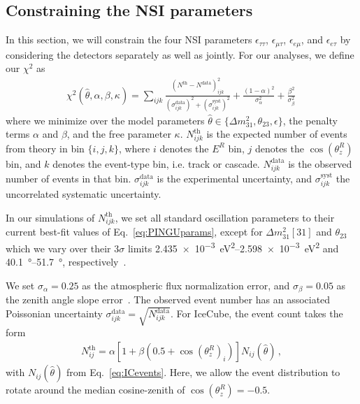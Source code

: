 \documentclass{revtex4-2}
\newcommand{\zreco}{\ensuremath{\cos{(\theta_z^{R})}}}
\newcommand{\Ereco}{E^{R}}
\newcommand{\emt}{\ensuremath{\epsilon_{\mu\tau}}}
\newcommand{\eet}{\epsilon_{e\tau}}
\newcommand{\eem}{\epsilon_{e\mu}}
\newcommand{\ett}{\ensuremath{\epsilon_{\tau\tau}}}
\newcommand{\dm}{\Delta m^2_{31}}
\begin{document}
\subsection{Constraining the NSI parameters}\label{sec:constraining} %
In this section, we will constrain the four NSI parameters $\ett$, $\emt$, $\eem$, and $\eet$ by considering the detectors separately as well as jointly.
For our analyses, we define our $\chi^2$ as
\begin{align}\label{eq:chisq}
    \chi^{2}(\hat{\theta},\alpha,\beta, \kappa)=\sum_{ijk} \frac{\left(N^\text{th}-N^\text{data}\right)_{ijk}^{2}}
    {\left(\sigma^\text{data}_{ijk}\right)^{2} + \left(\sigma^\text{syst}_{ijk}\right)^{2}}+ 
    \frac{(1-\alpha)^2}{\sigma_\alpha^2} + \frac{\beta^2}{\sigma_\beta^2}\,
\end{align}
where we minimize over the model parameters $\hat{\theta} \in \{\dm, \theta_{23}, \epsilon\}$, the penalty terms $\alpha$ and $\beta$, and the free parameter $\kappa$.
$N_{ijk}^\text{th}$ is the expected number of events from theory in bin $\{i,j,k\}$, where $i$ denotes the $\Ereco$ bin, $j$ denotes the $\zreco$ bin,
and $k$ denotes the event-type bin, i.e. track or cascade. 
$N_{ijk}^\text{data}$ is the observed number of events in that bin. $\sigma^\text{data}_{ijk}$ is the experimental uncertainty, and $\sigma^\text{syst}_{ijk}$ the uncorrelated systematic
uncertainty.

In our simulations of $N_{ijk}^\text{th}$, we set all standard oscillation parameters to their current best-fit values of Eq.~\ref{eq:PINGUparams}, 
except for $\dm[31]$ and $\theta_{23}$
which we vary over their $3\sigma$ limits \SIrange{2.435e-3}{2.598e-3}{\eV\squared} and \SIrange{40.1}{51.7}{\degree}, respectively~\cite{nufit}.

We set $\sigma_\alpha = 0.25$ as the atmospheric flux normalization error, and $\sigma_\beta = 0.05$ as the zenith angle slope error~\cite{hondapaper}. 
The observed event number has an associated Poissonian uncertainty $\sigma_{ijk}^\text{data} = \sqrt{N_{ijk}^\text{data}}$.
For IceCube, the event count takes the form
\begin{align}
    N^\text{th}_{ij} = \alpha\left[1+\beta (0.5 + \zreco_i )\right] N_{ij}(\hat{\theta})\,,
\end{align}
with $N_{ij}(\hat{\theta})$ from Eq.~\ref{eq:ICevents}. Here, we allow the event distribution to rotate around the median cosine-zenith of $\zreco = -0.5$.
\end{document}
